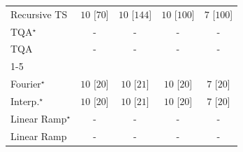 \begin{tabular}{l|cccc|}
Recursive TS & {\cellcolor[HTML]{00441B}} \color[HTML]{F1F1F1} $10$ [$70$] & {\cellcolor[HTML]{00441B}} \color[HTML]{F1F1F1} $10$ [$144$] & {\cellcolor[HTML]{00441B}} \color[HTML]{F1F1F1} $10$ [$100$] & {\cellcolor[HTML]{37A055}} \color[HTML]{F1F1F1} $7$ [$100$] \\
TQA$^\star$ & {\cellcolor[HTML]{000000}} \color[HTML]{F1F1F1} {\cellcolor{white}} \color{black} - & {\cellcolor[HTML]{000000}} \color[HTML]{F1F1F1} {\cellcolor{white}} \color{black} - & {\cellcolor[HTML]{000000}} \color[HTML]{F1F1F1} {\cellcolor{white}} \color{black} - & {\cellcolor[HTML]{000000}} \color[HTML]{F1F1F1} {\cellcolor{white}} \color{black} - \\
TQA & {\cellcolor[HTML]{000000}} \color[HTML]{F1F1F1} {\cellcolor{white}} \color{black} - & {\cellcolor[HTML]{000000}} \color[HTML]{F1F1F1} {\cellcolor{white}} \color{black} - & {\cellcolor[HTML]{000000}} \color[HTML]{F1F1F1} {\cellcolor{white}} \color{black} - & {\cellcolor[HTML]{000000}} \color[HTML]{F1F1F1} {\cellcolor{white}} \color{black} - \\
\cline{1-5}
\multicolumn{5}{c}{\rule{0pt}{8pt}SV} \\
\midrule
Fourier$^\star$ & {\cellcolor[HTML]{00441B}} \color[HTML]{F1F1F1} $10$ [$20$] & {\cellcolor[HTML]{00441B}} \color[HTML]{F1F1F1} $10$ [$21$] & {\cellcolor[HTML]{00441B}} \color[HTML]{F1F1F1} $10$ [$20$] & {\cellcolor[HTML]{37A055}} \color[HTML]{F1F1F1} $7$ [$20$] \\
Interp.$^\star$ & {\cellcolor[HTML]{00441B}} \color[HTML]{F1F1F1} $10$ [$20$] & {\cellcolor[HTML]{00441B}} \color[HTML]{F1F1F1} $10$ [$21$] & {\cellcolor[HTML]{00441B}} \color[HTML]{F1F1F1} $10$ [$20$] & {\cellcolor[HTML]{37A055}} \color[HTML]{F1F1F1} $7$ [$20$] \\
Linear Ramp$^\star$ & {\cellcolor[HTML]{000000}} \color[HTML]{F1F1F1} {\cellcolor{white}} \color{black} - & {\cellcolor[HTML]{000000}} \color[HTML]{F1F1F1} {\cellcolor{white}} \color{black} - & {\cellcolor[HTML]{000000}} \color[HTML]{F1F1F1} {\cellcolor{white}} \color{black} - & {\cellcolor[HTML]{000000}} \color[HTML]{F1F1F1} {\cellcolor{white}} \color{black} - \\
Linear Ramp & {\cellcolor[HTML]{000000}} \color[HTML]{F1F1F1} {\cellcolor{white}} \color{black} - & {\cellcolor[HTML]{000000}} \color[HTML]{F1F1F1} {\cellcolor{white}} \color{black} - & {\cellcolor[HTML]{000000}} \color[HTML]{F1F1F1} {\cellcolor{white}} \color{black} - & {\cellcolor[HTML]{000000}} \color[HTML]{F1F1F1} {\cellcolor{white}} \color{black} - \\

\end{tabular}
